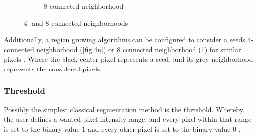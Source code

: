 \begin{figure}[h!]
\begin{subfigure}{0.49\textwidth}
{}
		\caption{8-connected neighborhood}\label{fig:8n}
	\end{subfigure}
	\caption{4- and 8-connected neighborhoods}\label{fig:neighborhoods}
\end{figure}

\noindent
Additionally, a region growing algorithms can be configured to consider a seeds 4-connected neighborhood
(\cref{fig:4n}) or 8 connected neighborhood (\cref{fig:8n}) for similar pixels \cite{jourlinVariousContrastConcepts2016,palReviewImageSegmentation1993}.
Where the black center pixel represents a seed, and its grey neighborhood represents the considered pixels.


\subsubsection{Threshold}
Possibly the simplest classical segmentation method is the threshold.
Whereby the user defines a wanted pixel intensity range, and every pixel within that range is set to the binary value $1$
and every other pixel is set to the binary value $0$ \cite{sankurSurveyImageThresholding2004}.

